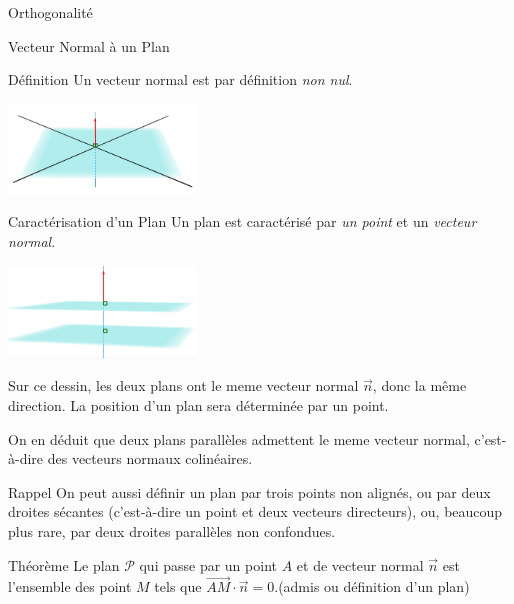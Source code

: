 \documentclass{coursbook}
\begin{document}
\begin{Gpartie}{Orthogonalité}
\begin{Spartie}{Vecteur Normal à un Plan}
\begin{SSpartie}{Définition}
                Un vecteur normal est par définition \emph{non nul}.
    
                \begin{center}
                        \includegraphics[width=5cm]{rsc/12fig3.png}
                    \parbox{\linewidth}{}
                \end{center}
            \end{SSpartie}
            \begin{SSpartie}{Caractérisation d'un Plan} 
                Un plan est caractérisé par \emph{un point} et un \emph{vecteur normal}.

                \begin{center}
                    \includegraphics[width=5cm]{rsc/12fig4.png}
                    \parbox{\linewidth}{}
                \end{center}
                
                                    Sur ce dessin, les deux plans ont le meme vecteur normal $\vec{n}$, donc la même direction. La position d'un plan sera déterminée par un point.
                
                                    On en déduit que deux plans parallèles admettent le meme vecteur normal, c'est-à-dire des vecteurs normaux colinéaires.
                \begin{SSSpartie}{Rappel} 
                    On peut aussi définir un plan par trois points non alignés, ou par deux droites sécantes (c'est-à-dire un point et deux vecteurs directeurs), ou, beaucoup plus rare, par deux droites parallèles non confondues.
                \end{SSSpartie}
            \end{SSpartie}
            \vfill
            \pagebreak
            \begin{SSpartie}{Théorème} 
                Le plan $\mathcal{P}$ qui passe par un point $A$ et de vecteur normal $\vec{n}$ est l'ensemble des point $M$ tels que $\overrightarrow{AM}\cdot\vec{n}=0$.\quad (admis ou définition d'un plan)


\end{SSpartie}
\end{Spartie}
\end{Gpartie}
\end{document}
